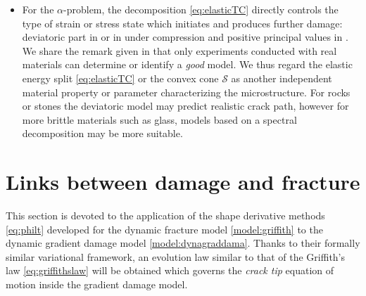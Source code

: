 \begin{itemize}
\item For the $\alpha$-problem, the decomposition \eqref{eq:elasticTC} directly controls the type of strain or stress state which initiates and produces further damage: deviatoric part in \cite{LancioniRoyer-Carfagni:2009} or in \cite{PhamAmorMarigoMaurini:2011} under compression and positive principal values in  \cite{MieheHofackerWelschinger:2010,FreddiRoyer-Carfagni:2010}. We share the remark given in \cite{AmbatiGerasimovLorenzis:2015} that only experiments conducted with real materials can determine or identify a \emph{good} model. We thus regard the elastic energy split \eqref{eq:elasticTC} or the convex cone $\mathcal{S}$ as another independent material property or parameter characterizing the microstructure. For rocks or stones the deviatoric model may predict realistic crack path, however for more brittle materials such as glass, models based on a spectral decomposition may be more suitable.
\end{itemize}

\section{Links between damage and fracture}
This section is devoted to the application of the shape derivative methods \eqref{eq:philt} developed for the dynamic fracture model \ref{model:griffith} to the dynamic gradient damage model \ref{model:dynagraddama}. Thanks to their formally similar variational framework, an evolution law similar to that of the Griffith's law \eqref{eq:griffithslaw} will be obtained which governs the \emph{crack tip} equation of motion inside the gradient damage model.

